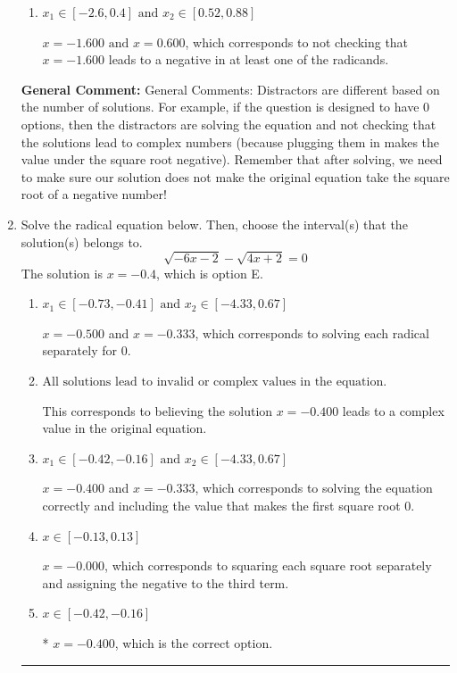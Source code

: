 \documentclass{extbook}[14pt]
\newcommand{\litem}[1]{\item #1

\rule{\textwidth}{0.4pt}}
\begin{document}
\begin{enumerate}
{\begin{enumerate}[label=\Alph*.]
$x = -1.600$, which corresponds to thinking this value does not make either radicand negative AND the value $x = 0.600$ does.
\item \( x_1 \in [-2.6, 0.4] \text{ and } x_2 \in [0.52,0.88] \)

$x = -1.600 \text{ and } x = 0.600$, which corresponds to not checking that $x = -1.600$ leads to a negative in at least one of the radicands.
\end{enumerate}

\textbf{General Comment:} General Comments: Distractors are different based on the number of solutions. For example, if the question is designed to have 0 options, then the distractors are solving the equation and not checking that the solutions lead to complex numbers (because plugging them in makes the value under the square root negative). Remember that after solving, we need to make sure our solution does not make the original equation take the square root of a negative number!
}
\litem{
Solve the radical equation below. Then, choose the interval(s) that the solution(s) belongs to.
\[ \sqrt{-6 x - 2} - \sqrt{4 x + 2} = 0 \]
The solution is \( x = -0.4 \), which is option E.\begin{enumerate}[label=\Alph*.]
\item \( x_1 \in [-0.73, -0.41] \text{ and } x_2 \in [-4.33,0.67] \)

$x = -0.500$ and $x = -0.333$, which corresponds to solving each radical separately for 0.
\item \( \text{All solutions lead to invalid or complex values in the equation.} \)

This corresponds to believing the solution $x = -0.400$ leads to a complex value in the original equation.
\item \( x_1 \in [-0.42, -0.16] \text{ and } x_2 \in [-4.33,0.67] \)

$x = -0.400$ and $x = -0.333$, which corresponds to solving the equation correctly and including the value that makes the first square root 0.
\item \( x \in [-0.13,0.13] \)

$x = -0.000$, which corresponds to squaring each square root separately and assigning the negative to the third term.
\item \( x \in [-0.42,-0.16] \)

* $x = -0.400$, which is the correct option.
\end{enumerate}

}
\end{enumerate}
\end{document}
